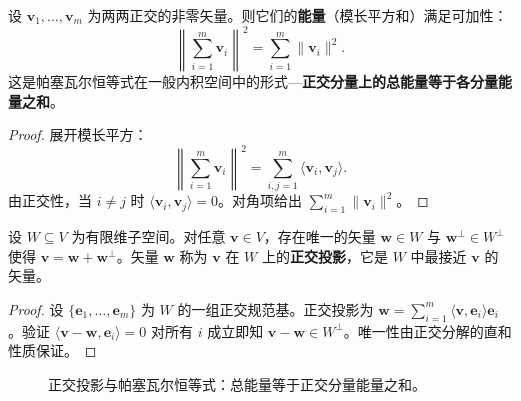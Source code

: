 \begin{proposition}[正交性与守恒律]\label{prop:orthogonality_conservation}
设 $\mathbf{v}_1, \dots, \mathbf{v}_m$ 为两两正交的非零矢量。则它们的\textbf{能量}（模长平方和）满足可加性：
\[
\left\| \sum_{i=1}^m \mathbf{v}_i \right\|^2 = \sum_{i=1}^m \|\mathbf{v}_i\|^2.
\]
这是帕塞瓦尔恒等式在一般内积空间中的形式---\textbf{正交分量上的总能量等于各分量能量之和}。
\end{proposition}

\begin{proof}
展开模长平方：
\[
\left\| \sum_{i=1}^m \mathbf{v}_i \right\|^2 = \sum_{i,j=1}^m \langle \mathbf{v}_i, \mathbf{v}_j \rangle.
\]
由正交性，当 $i \neq j$ 时 $\langle \mathbf{v}_i, \mathbf{v}_j \rangle = 0$。对角项给出 $\sum_{i=1}^m \|\mathbf{v}_i\|^2$。
\end{proof}

\begin{proposition}[正交投影定理]\label{prop:orthogonal_projection}
设 $W \subseteq V$ 为有限维子空间。对任意 $\mathbf{v} \in V$，存在唯一的矢量 $\mathbf{w} \in W$ 与 $\mathbf{w}^\perp \in W^\perp$ 使得 $\mathbf{v} = \mathbf{w} + \mathbf{w}^\perp$。矢量 $\mathbf{w}$ 称为 $\mathbf{v}$ 在 $W$ 上的\textbf{正交投影}，它是 $W$ 中最接近 $\mathbf{v}$ 的矢量。
\end{proposition}

\begin{proof}
设 $\{\mathbf{e}_1, \dots, \mathbf{e}_m\}$ 为 $W$ 的一组正交规范基。正交投影为 $\mathbf{w} = \sum_{i=1}^m \langle \mathbf{v}, \mathbf{e}_i \rangle \mathbf{e}_i$。验证 $\langle \mathbf{v} - \mathbf{w}, \mathbf{e}_i \rangle = 0$ 对所有 $i$ 成立即知 $\mathbf{v} - \mathbf{w} \in W^\perp$。唯一性由正交分解的直和性质保证。
\end{proof}

\begin{figure}[htbp]
\centering
{}
\caption{正交投影与帕塞瓦尔恒等式：总能量等于正交分量能量之和。}
\label{fig:orthogonal_projection}
\end{figure}

